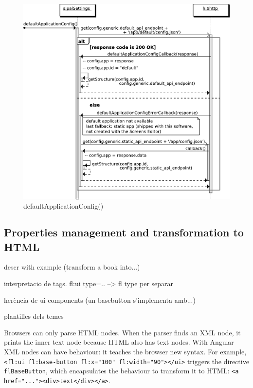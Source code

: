 \begin{figure}
    \centering
    \includegraphics{figures/design/seqdia/palSettings-defaultApplicationConfig.pdf}
    \caption{defaultApplicationConfig()}
    \label{fig:design-seqdia-palSettings-defaultApplicationConfig}
\end{figure}

\FloatBarrier

\subsection{Properties management and transformation to \ac{HTML}}
descr with example (transform a  book into...)

interpretacio de tags. fl:ui type=.. --> fl {type} per separar

herència de ui components (un basebutton s'implementa amb...)

plantilles dels temes

Browsers can only parse \ac{HTML} nodes.
When the parser finds an \ac{XML} node, it prints the inner text node because \ac{HTML} also has text nodes.
With Angular \ac{XML} nodes can have behaviour: it teaches the browser new syntax.
For example, \lstinline$<fl:ui fl:base-button fl:x="100" fl:width="90"></ui>$ triggers the directive \lstinline$flBaseButton$, which encapsulates the behaviour to transform it to \ac{HTML}: \lstinline$<a href="..."><div>text</div></a>$.

